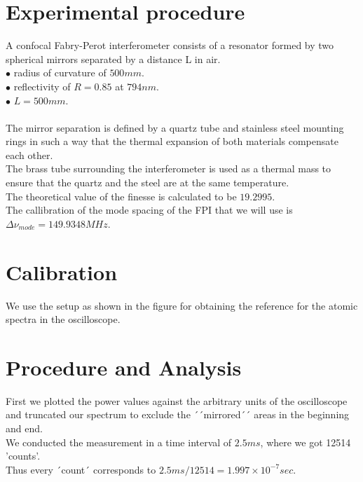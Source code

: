 \documentclass[openany,11pt,a4paper]{book}
\begin{document}
\section*{Experimental procedure}
A confocal Fabry-Perot interferometer consists of a resonator formed by two spherical mirrors separated by a distance L in air.\\



$\bullet $ radius of curvature of $500 mm$.\\
$\bullet $ reflectivity of $ R = 0.85$ at $794 nm$.\\
$\bullet $ $L=500mm$.\\\\
The mirror separation is defined by a quartz tube and stainless steel mounting rings in such a way that the thermal expansion of both materials compensate each other. \\
The brass tube surrounding the interferometer is used as a thermal mass to ensure that the quartz and the steel are at the same temperature.\\

The theoretical value of the finesse is calculated to be $19.2995$.\\

The callibration of the mode spacing of the FPI that we will use is  $ \Delta \nu_{mode} = 149.9348 MHz$.\\



\section{ Calibration}

We use the setup as shown in the figure for obtaining the reference for the atomic spectra in the oscilloscope.\\

\section*{Procedure and Analysis}

First we plotted the power values against the arbitrary units of the oscilloscope and truncated our spectrum to exclude the ´´mirrored´´ areas in the beginning and end. \\

We conducted the measurement in a time interval of $2.5 ms$, where we got 12514 'counts'.\\
Thus every ´count´ corresponds to $2.5 ms/12514=1.997 \times 10^{-7} sec$.
\end{document}
